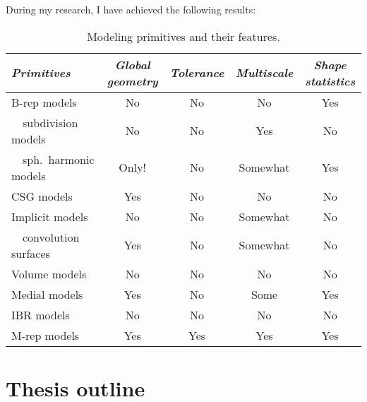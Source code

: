 During my research, I have achieved the following results:

\begin{table*}
\centering
\begin{tabular}{l|c|c|c|c}
\emph{Primitives}& \emph{Global geometry}& \emph{Tolerance} & \emph{Multiscale}
& \emph{Shape statistics}
\\
\hline
B-rep models            & No        & No    & No & Yes\\
\ \ subdivision models  & No        & No    & Yes & No \\
\ \ sph.\ harmonic models & Only!    & No    & Somewhat & Yes \\
\hline
CSG models              & Yes       & No    & No & No \\
\hline
Implicit models         & No        & No    & Somewhat & No\\
\ \ convolution surfaces & Yes      & No    & Somewhat & No\\
\hline
Volume models           & No        & No    & No & No\\
\hline
Medial models           & Yes       & No    & Some & Yes \\
\hline
IBR models              & No        & No    & No & No \\
\hline
M-rep models            & Yes       & Yes   & Yes & Yes
\end{tabular}
\caption{\label{tb:Table1} Modeling primitives and their features.}
\end{table*}

\section{Thesis outline}
